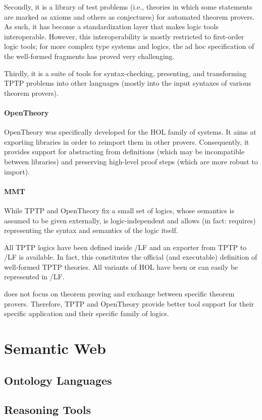 \documentclass[12pt]{article}
\newcommand{\system}[2][]{\paragraph{#2}#2 \ifnonempty[\cite{#2}]{#1}{\cite{#1}}}
\begin{document}
Secondly, it is a library of test problems (i.e., theories in which some statements are marked as axioms and others as conjectures) for automated theorem provers.
As such, it has become a standardization layer that makes logic tools interoperable.
However, this interoperability is mostly restricted to first-order logic tools; for more complex type systems and logics, the ad hoc specification of the well-formed fragments has proved very challenging.

Thirdly, it is a suite of tools for syntax-checking, presenting, and transforming TPTP problems into other languages (mostly into the input syntaxes of various theorem provers).

\system{OpenTheory} was specifically developed for the HOL family of systems.
It aims at exporting libraries in order to reimport them in other provers.
Consequently, it provides support for abstracting from definitions (which may be incompatible between libraries) and preserving high-level proof steps (which are more robust to import).

\paragraph{MMT}
While TPTP and OpenTheory fix a small set of logics, whose semantics is assumed to be given externally, \mmt is logic-independent and allows (in fact: requires) representing the syntax and semantics of the logic itself.

All TPTP logics have been defined inside \mmt/LF and an exporter from TPTP to \mmt/LF is available.
In fact, this constitutes the official (and executable) definition of well-formed TPTP theories.
All variants of HOL have been or can easily be represented in \mmt/LF.

\mmt does not focus on theorem proving and exchange between specific theorem provers.
Therefore, TPTP and OpenTheory provide better tool support for their specific application and their specific family of logics.

\section{Semantic Web}

\subsection{Ontology Languages}

\subsection{Reasoning Tools}
\end{document}
